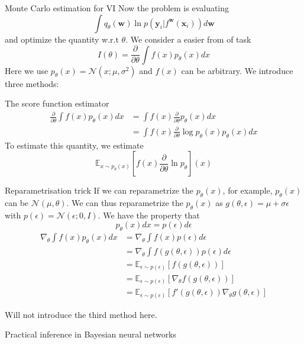 \documentclass{beamer}
\begin{document}
\begin{frame}[allowframebreaks]{Monte Carlo estimation for VI}
Now the problem is evaluating $$\int q_\theta(\mathbf{w}) \ln p(\mathbf{y}_i | f^\mathbf{w} (\mathbf{x}_i)) d\mathbf{w}$$ and optimize the quantity w.r.t $\theta$.
We consider a easier from of task
$$I(\theta) = \frac{\partial}{\partial \theta} \int f(x) p_\theta(x) dx$$
Here we use $p_\theta(x) = \mathcal{N} (x; \mu, \sigma^2)$ and $f(x)$ can be arbitrary. We introduce three methods:

\framebreak

\begin{block}{The score function estimator}
\begin{align*}
\frac{\partial}{\partial \theta} \int f(x) p_\theta(x) dx & = \int f(x) \frac{\partial}{\partial \theta} p_\theta(x) dx \\
& = \int f(x) \frac{\partial}{\partial \theta} \log p_\theta (x) p_\theta (x) dx 
\end{align*}
To estimate this quantity, we estimate $$\mathbb{E}_{x \sim p_\theta(x)}[f(x) \frac{\partial}{\partial \theta} \ln p_\theta](x)$$

\end{block}

\framebreak

\begin{block}{Reparametrisation trick}
If we can reparametrize the $p_\theta(x)$, for example, $p_\theta(x)$ can be $\mathcal{N}(\mu, \theta)$. We can thus reparametrize the $p_\theta(x)$ as $g(\theta, \epsilon) = \mu + \sigma \epsilon$ with $p(\epsilon) = \mathcal{N}(\epsilon; 0, I)$. We have the property that
$$p_\theta(x) dx = p(\epsilon) d \epsilon$$
\begin{align*}
\nabla_\theta \int f(x) p_\theta(x) dx & = \nabla_\theta  \int f(x) p(\epsilon) d\epsilon \\
& = \nabla_\theta  \int f(g(\theta, \epsilon)) p(\epsilon) d\epsilon \\ 
& = \mathbb{E}_{\epsilon \sim p(\epsilon)} [f(g(\theta, \epsilon))] \\ 
& = \mathbb{E}_{\epsilon \sim p(\epsilon)} [\nabla_\theta f(g(\theta, \epsilon))] \\
& = \mathbb{E}_{\epsilon \sim p(\epsilon)} [f'(g(\theta, \epsilon)) \nabla_\theta g(\theta, \epsilon)]
\end{align*}
\end{block}

Will not introduce the third method here.
\end{frame}

\begin{frame}[allowframebreaks]{Practical inference in Bayesian neural networks}


\end{frame}
\end{document}
